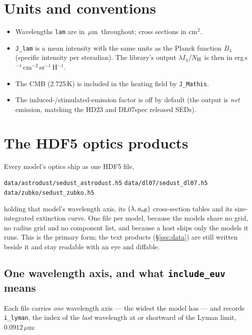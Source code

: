 \documentclass{my_memo}
\newcommand{\code}[1]{\texttt{#1}}
\newcommand{\lamIlam}{\ensuremath{\lambda I_\lambda}}
\newcommand{\Nh}{\ensuremath{N_{\rm H}}}
\newcommand{\um}{\ensuremath{\,\mu\mathrm{m}}}
\begin{document}
\section{Units and conventions}

\begin{itemize}
\item Wavelengths \code{lam} are in \um\ throughout; cross sections in cm$^2$.
\item \code{J\_lam} is a mean intensity with the same units as the Planck
      function $B_\lambda$ (specific intensity per steradian). The library's
      output \lamIlam$/\Nh$ is then in
      erg\,s$^{-1}$\,cm$^{-2}$\,sr$^{-1}$\,H$^{-1}$.
\item The CMB (2.725\,K) is included in the heating field by \code{J\_Mathis}.
\item The induced-/stimulated-emission factor is off by default (the output is
      \emph{net} emission, matching the HD23 and DL07spec released SEDs).
\end{itemize}

\section{The HDF5 optics products}\label{sec:hdf5}

Every model's optics ship as one HDF5 file,

\begin{center}
\code{data/astrodust/sedust\_astrodust.h5} \quad \code{data/dl07/sedust\_dl07.h5}
\quad \code{data/zubko/sedust\_zubko.h5}
\end{center}

\noindent holding that model's wavelength axis, its $(\lambda, a_{\rm eff})$
cross-section tables and its size-integrated extinction curve. One file per
model, because the models share no grid, no radius grid and no component list,
and because a host ships only the models it runs. This is the primary form; the
text products (\S\ref{sec:data}) are still written beside it and stay readable
with an eye and diffable.

\subsection{One wavelength axis, and what \code{include\_euv} means}

Each file carries \emph{one} wavelength axis --- the widest the model has ---
and records \code{i\_lyman}, the index of the \emph{last} wavelength at or
shortward of the Lyman limit, $0.0912$\um:
\end{document}
